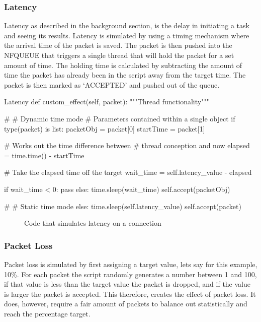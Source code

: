 \subsubsection{Latency}
Latency as described in the background section, is the delay in initiating a task and seeing its results. Latency is simulated by using a timing mechanism where the arrival time of the packet is saved. The packet is then pushed into the NFQUEUE that triggers a single thread that will hold the packet for a set amount of time. The holding time is calculated by subtracting the amount of time the packet has already been in the script away from the target time. The packet is then marked as `ACCEPTED' and pushed out of the queue.

\begin{Code}{Latency}
def custom_effect(self, packet):
	"""Thread functionality"""

	# # Dynamic time mode
	# Parameters contained within a single object
	if type(packet) is list:
		packetObj = packet[0]
		startTime = packet[1]

		# Works out the time difference between
		# thread conception and now
		elapsed = time.time() - startTime
            
		# Take the elapsed time off the target
		wait_time = self.latency_value - elapsed

		if wait_time < 0:
			pass
		else:
			time.sleep(wait_time)
			self.accept(packetObj)
			
	# # Static time mode
	else:
		time.sleep(self.latency_value)
		self.accept(packet)

\end{Code}
\begin{figure}[h]
	\caption{Code that simulates latency on a connection}
\end{figure}

\subsubsection{Packet Loss}
Packet loss is simulated by first assigning a target value, lets say for this example, 10\%. For each packet the script randomly generates a number between 1 and 100, if that value is less than the target value the packet is dropped, and if the value is larger the packet is accepted. This therefore, creates the effect of packet loss. It does, however, require a fair amount of packets to balance out statistically and reach the percentage target.

